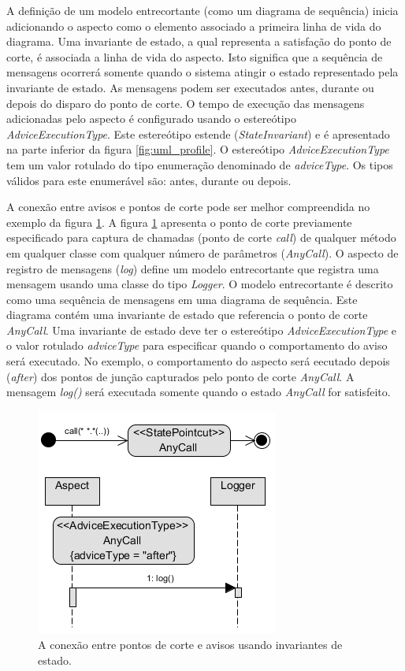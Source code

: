 A definição de um modelo entrecortante (como um diagrama de sequência) inicia adicionando o aspecto como o elemento associado a primeira linha de vida
do diagrama. Uma invariante de estado, a qual representa a satisfação do ponto de corte, é associada a linha de vida do aspecto. Isto significa que a
sequência de mensagens ocorrerá somente quando o sistema atingir o estado representado pela invariante de estado. As mensagens podem ser executados
antes, durante ou depois do disparo do ponto de corte. O tempo de execução das mensagens adicionadas pelo aspecto é configurado usando o estereótipo
\textit{AdviceExecutionType}. Este estereótipo estende (\textit{StateInvariant}) e é apresentado na parte inferior da figura \ref{fig:uml_profile}. O
estereótipo \textit{AdviceExecutionType} tem um valor rotulado do tipo enumeração denominado de \textit{adviceType}. Os tipos válidos para este enumerável são:
antes, durante ou depois.

A conexão entre avisos e pontos de corte pode ser melhor compreendida no exemplo da figura \ref{fig:behavioral_profile_example}. A figura
\ref{fig:behavioral_profile_example} apresenta o ponto de corte previamente especificado para captura de chamadas (ponto de corte \textit{call}) de
qualquer método em qualquer classe com qualquer número de parâmetros (\textit{AnyCall}). O aspecto de registro de mensagens (\textit{log}) define um
modelo entrecortante que registra uma mensagem usando uma classe do tipo \textit{Logger}. O modelo entrecortante é descrito como uma sequência de
mensagens em uma diagrama de sequência. Este diagrama contém uma invariante de estado que referencia o ponto de corte \textit{AnyCall}. Uma invariante
de estado deve ter o estereótipo \textit{AdviceExecutionType} e o valor rotulado \textit{adviceType} para especificar quando o comportamento do aviso
será executado. No exemplo, o comportamento do aspecto será eecutado depois (\textit{after}) dos pontos de junção capturados pelo ponto de corte
\textit{AnyCall}. A mensagem \textit{log()} será executada somente quando o estado \textit{AnyCall} for satisfeito.


\begin{figure}[h]
	\centering
	\includegraphics{img/behavioral_profile_example.png}
	\caption{A conexão entre pontos de corte e avisos usando invariantes de estado.}\label{fig:behavioral_profile_example}
\end{figure}

